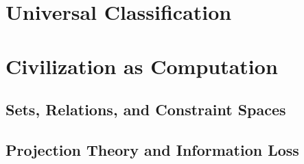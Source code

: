 \documentclass[
  12pt,
  twoside,
  openright,
  a4paper
]{book}
\begin{document}
\part{Universal Classification}





\part{Civilization as Computation}





\backmatter

\appendix

\chapter{Sets, Relations, and Constraint Spaces}


\chapter{Projection Theory and Information Loss}


\end{document}

